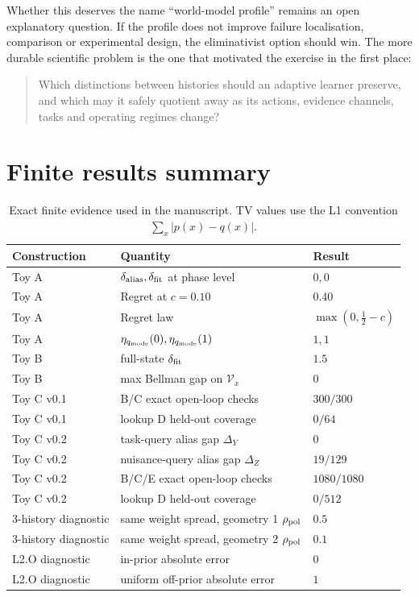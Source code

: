 \documentclass[10pt]{article}
\begin{document}
Whether this deserves the name ``world-model profile'' remains an open explanatory question. If the profile does not improve failure localisation, comparison or experimental design, the eliminativist option should win. The more durable scientific problem is the one that motivated the exercise in the first place:
\begin{quote}
Which distinctions between histories should an adaptive learner preserve, and which may it safely quotient away as its actions, evidence channels, tasks and operating regimes change?
\end{quote}

\clearpage
\appendix
\section{Finite results summary}

\begin{table}[H]
\centering
\caption{Exact finite evidence used in the manuscript. TV values use the L1 convention $\sum_x|p(x)-q(x)|$.}
\begin{tabular}{@{}lll@{}}
\toprule
Construction & Quantity & Result \\
\midrule
Toy A & $\delta_{\rm alias},\delta_{\rm fit}$ at phase level & $0,0$ \\
Toy A & Regret at $c=0.10$ & $0.40$ \\
Toy A & Regret law & $\max(0,\frac12-c)$ \\
Toy A & $\eta_{q_{\rm mode}}(0),\eta_{q_{\rm mode}}(1)$ & $1,1$ \\
Toy B & full-state $\delta_{\rm fit}$ & $1.5$ \\
Toy B & max Bellman gap on $\mathcal V_x$ & $0$ \\
Toy C v0.1 & B/C exact open-loop checks & $300/300$ \\
Toy C v0.1 & lookup D held-out coverage & $0/64$ \\
Toy C v0.2 & task-query alias gap $\Delta_Y$ & $0$ \\
Toy C v0.2 & nuisance-query alias gap $\Delta_Z$ & $19/129$ \\
Toy C v0.2 & B/C/E exact open-loop checks & $1080/1080$ \\
Toy C v0.2 & lookup D held-out coverage & $0/512$ \\
3-history diagnostic & same weight spread, geometry 1 $\rho_{\rm pol}$ & $0.5$ \\
3-history diagnostic & same weight spread, geometry 2 $\rho_{\rm pol}$ & $0.1$ \\
L2.O diagnostic & in-prior absolute error & $0$ \\
L2.O diagnostic & uniform off-prior absolute error & $1$ \\
\bottomrule
\end{tabular}
\end{table}
\end{document}
